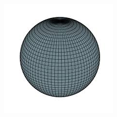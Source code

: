 \documentclass[11pt]{report}
\begin{document}
\begin{description}
\begin{minipage}{0.7\linewidth}
            \end{minipage}
        \begin{minipage}{0.3\linewidth}
            \centering
            \includegraphics[width=\linewidth]{figures/equi_sphere.jpg}
            \label{fig:equi_sphere}
        \end{minipage}

\end{description}
\end{document}
